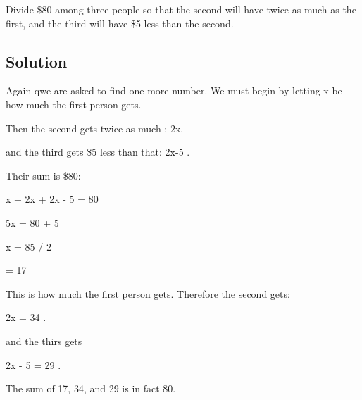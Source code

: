 \documentclass[12pt]{article}%
\begin{document}
Divide \$80 among three people so that the second will have twice as much as the first, and the third will have \$5 less than the second.

\subsection{Solution}

Again qwe are asked to find one more number. We must begin by letting x be how much the first person gets.

Then the second gets twice as much : 2x. 

and the third gets \$5 less than that: 2x-5 .

Their sum is \$80: 

x + 2x + 2x - 5 = 80 

5x = 80 + 5

x = 85 / 2 

= 17 

This is how much the first person gets. Therefore the second gets: 

2x = 34 . 

and the thirs gets 

2x - 5 = 29 . 

The sum of 17, 34, and 29 is in fact 80. 
\end{document}
